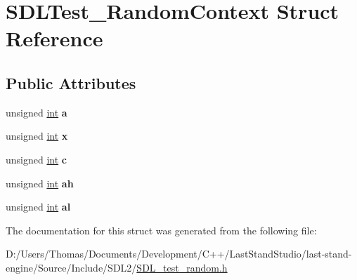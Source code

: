 \hypertarget{structSDLTest__RandomContext}{}\section{S\+D\+L\+Test\+\_\+\+Random\+Context Struct Reference}
\label{structSDLTest__RandomContext}
\subsection*{Public Attributes}
\begin{DoxyCompactItemize}
\item 
\hypertarget{structSDLTest__RandomContext_a24f830d6cb476c96fbe325c99331e45f}{}unsigned \hyperlink{SDL__thread_8h_a6a64f9be4433e4de6e2f2f548cf3c08e}{int} {\bfseries a}\label{structSDLTest__RandomContext_a24f830d6cb476c96fbe325c99331e45f}

\item 
\hypertarget{structSDLTest__RandomContext_a8bd6d1b4e1677ed1c06f5cc09f1af5b6}{}unsigned \hyperlink{SDL__thread_8h_a6a64f9be4433e4de6e2f2f548cf3c08e}{int} {\bfseries x}\label{structSDLTest__RandomContext_a8bd6d1b4e1677ed1c06f5cc09f1af5b6}

\item 
\hypertarget{structSDLTest__RandomContext_a17a6a7e7b68a33c67d9b74c8c7c33198}{}unsigned \hyperlink{SDL__thread_8h_a6a64f9be4433e4de6e2f2f548cf3c08e}{int} {\bfseries c}\label{structSDLTest__RandomContext_a17a6a7e7b68a33c67d9b74c8c7c33198}

\item 
\hypertarget{structSDLTest__RandomContext_a2c8d2f1ee16cdfd38361b8f03b3fdb85}{}unsigned \hyperlink{SDL__thread_8h_a6a64f9be4433e4de6e2f2f548cf3c08e}{int} {\bfseries ah}\label{structSDLTest__RandomContext_a2c8d2f1ee16cdfd38361b8f03b3fdb85}

\item 
\hypertarget{structSDLTest__RandomContext_a0e2bccd3611d383d6510c6c828aa54c4}{}unsigned \hyperlink{SDL__thread_8h_a6a64f9be4433e4de6e2f2f548cf3c08e}{int} {\bfseries al}\label{structSDLTest__RandomContext_a0e2bccd3611d383d6510c6c828aa54c4}

\end{DoxyCompactItemize}


The documentation for this struct was generated from the following file\+:\begin{DoxyCompactItemize}
\item 
D\+:/\+Users/\+Thomas/\+Documents/\+Development/\+C++/\+Last\+Stand\+Studio/last-\/stand-\/engine/\+Source/\+Include/\+S\+D\+L2/\hyperlink{SDL__test__random_8h}{S\+D\+L\+\_\+test\+\_\+random.\+h}\end{DoxyCompactItemize}
